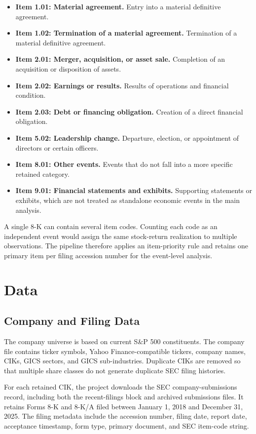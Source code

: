 \documentclass[12pt]{article}
\begin{document}
\begin{itemize}
    \item \textbf{Item 1.01: Material agreement.} Entry into a material definitive agreement.
    \item \textbf{Item 1.02: Termination of a material agreement.} Termination of a material definitive agreement.
    \item \textbf{Item 2.01: Merger, acquisition, or asset sale.} Completion of an acquisition or disposition of assets.
    \item \textbf{Item 2.02: Earnings or results.} Results of operations and financial condition.
    \item \textbf{Item 2.03: Debt or financing obligation.} Creation of a direct financial obligation.
    \item \textbf{Item 5.02: Leadership change.} Departure, election, or appointment of directors or certain officers.
    \item \textbf{Item 8.01: Other events.} Events that do not fall into a more specific retained category.
    \item \textbf{Item 9.01: Financial statements and exhibits.} Supporting statements or exhibits, which are not treated as standalone economic events in the main analysis.
\end{itemize}

A single 8-K can contain several item codes. Counting each code as an independent event would assign the same stock-return realization to multiple observations. The pipeline therefore applies an item-priority rule and retains one primary item per filing accession number for the event-level analysis.

\section{Data}

\subsection{Company and Filing Data}

The company universe is based on current S\&P 500 constituents. The company file contains ticker symbols, Yahoo Finance-compatible tickers, company names, CIKs, GICS sectors, and GICS sub-industries. Duplicate CIKs are removed so that multiple share classes do not generate duplicate SEC filing histories.

For each retained CIK, the project downloads the SEC company-submissions record, including both the recent-filings block and archived submissions files. It retains Forms 8-K and 8-K/A filed between January 1, 2018 and December 31, 2025. The filing metadata include the accession number, filing date, report date, acceptance timestamp, form type, primary document, and SEC item-code string.
\end{document}
